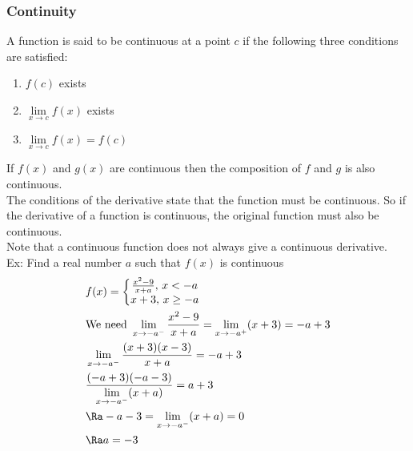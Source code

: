 \subsubsection{Continuity}
A function is said to be continuous at a point $c$ if the following three conditions are satisfied:
\begin{enumerate}
    \item $f(c)$ exists
    \item $\lim\limits_{x\to c}f(x)$ exists
    \item $\lim\limits_{x\to c}f(x)=f(c)$
\end{enumerate}
If $f(x)$ and $g(x)$ are continuous then the composition of $f$ and $g$ is also continuous.\\
The conditions of the derivative state that the function must be continuous. So if the derivative of a function is continuous, the original function must also be continuous.\\
Note that a continuous function does not always give a continuous derivative.\\
Ex: Find a real number $a$ such that $f(x)$ is continuous 
\begin{align*}
    &f(x)=\left\{\begin{matrix}
    \frac{x^2-9}{x+a},\, x<-a\\
    x+3,\,x\geq-a
    \end{matrix}\right.\\
    &\text{We need }\lim_{x\to-a^-}\frac{x^2-9}{x+a}=\lim_{x\to-a^+}(x+3)=-a+3\\
    &\lim_{x\to -a^-}\frac{(x+3)(x-3)}{x+a}=-a+3\\
    &\frac{(-a+3)(-a-3)}{\lim\limits_{x\to-a^-}(x+a)}=a+3\\
    &\Ra-a-3=\lim_{x\to-a^-}(x+a)=0\\
    &\Ra a=-3
\end{align*}